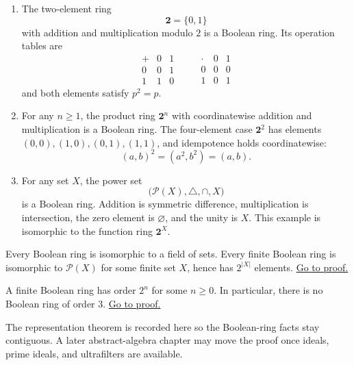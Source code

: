 \begin{example}
\label{ex:boolean-ring-standard-examples}
\begin{enumerate}[label=(\roman*)]
  \item The two-element ring
        \[
          \mathbf{2}=\{0,1\}
        \]
        with addition and multiplication modulo $2$ is a Boolean ring.
        Its operation tables are
        \[
        \begin{array}{c|cc}
        + & 0 & 1\\ \hline
        0 & 0 & 1\\
        1 & 1 & 0
        \end{array}
        \qquad
        \begin{array}{c|cc}
        \cdot & 0 & 1\\ \hline
        0 & 0 & 0\\
        1 & 0 & 1
        \end{array}
        \]
        and both elements satisfy $p^2=p$.

  \item For any $n\geq 1$, the product ring $\mathbf{2}^n$ with
        coordinatewise addition and multiplication is a Boolean ring.
        The four-element case $\mathbf{2}^2$ has elements
        $(0,0),(1,0),(0,1),(1,1)$, and idempotence holds coordinatewise:
        \[
          (a,b)^2=(a^2,b^2)=(a,b).
        \]

  \item For any set $X$, the power set
        \[
          \bigl(\mathcal P(X),\triangle,\cap,X\bigr)
        \]
        is a Boolean ring. Addition is symmetric difference, multiplication
        is intersection, the zero element is $\varnothing$, and the unity is
        $X$. This example is isomorphic to the function ring $\mathbf{2}^{X}$.
\end{enumerate}
\end{example}

\begin{theorem}
\label{thm:stone-representation-boolean-rings}
Every Boolean ring is isomorphic to a field of sets. Every finite Boolean
ring is isomorphic to $\mathcal P(X)$ for some finite set $X$, hence has
$2^{|X|}$ elements.
\hyperref[prf:stone-representation-boolean-rings]{Go to proof.}
\end{theorem}

\begin{corollary}
\label{cor:boolean-ring-finite-order-power-two}
A finite Boolean ring has order $2^n$ for some $n\geq 0$. In particular,
there is no Boolean ring of order $3$.
\hyperref[prf:boolean-ring-finite-order-power-two]{Go to proof.}
\end{corollary}

\begin{remark*}
The representation theorem is recorded here so the Boolean-ring facts stay
contiguous. A later abstract-algebra chapter may move the proof once ideals,
prime ideals, and ultrafilters are available.
\end{remark*}
